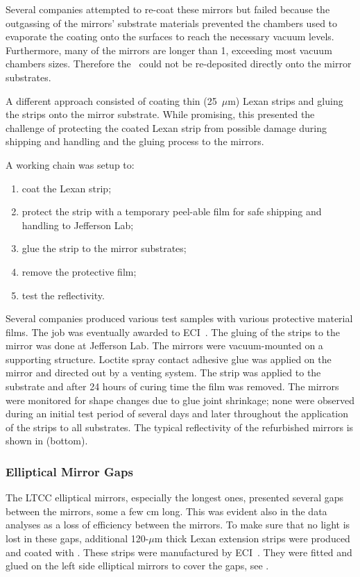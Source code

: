 Several companies attempted to re-coat these mirrors but failed because the outgassing of the mirrors' substrate materials
prevented the chambers used to evaporate the coating onto the surfaces to reach the necessary vacuum levels.
Furthermore, many of the mirrors are longer than 1, exceeding most vacuum chambers sizes. Therefore the \coating\
could not be re-deposited directly onto the mirror substrates.

A different approach consisted of coating thin (25~$\mu$m) Lexan strips and gluing the strips onto the mirror
substrate. While promising, this presented the challenge of protecting the coated Lexan strip from possible
damage during shipping and handling and the gluing process to the mirrors.

A working chain was setup to:

\begin{enumerate}
	\item coat the Lexan strip;
	\item protect the strip with a temporary peel-able film for safe shipping and handling to Jefferson Lab;
	\item glue the strip to the mirror substrates;
	\item remove the protective film;
	\item test the reflectivity.
\end{enumerate}

Several companies produced various test samples with various protective material films. The job was eventually awarded
to ECI~\cite{ECI}. The gluing of the strips to the mirror was done at Jefferson Lab. The mirrors were vacuum-mounted
on a supporting structure. Loctite spray contact adhesive glue was applied on the mirror and directed out by a venting
system. The strip was applied to the substrate and after 24 hours of curing time the film was removed.
The mirrors were monitored for shape changes due to glue joint shrinkage; none were observed during an initial test
period of several days and later throughout the application of the strips to all substrates.
The typical reflectivity of the refurbished mirrors is shown in  (bottom).

\subsubsection{Elliptical Mirror Gaps}

The LTCC elliptical mirrors, especially the longest ones, presented several gaps between the mirrors, some a few
cm long. This was evident also in the data analyses as a loss of efficiency between the mirrors. To make sure that
no light is lost in these gaps, additional 120-$\mu$m thick Lexan extension strips were produced and coated with
\coating. These strips were manufactured by ECI~\cite{ECI}. They were fitted and glued on the left side
elliptical mirrors to cover the gaps, see \F{gapBeforeAndAfter}.


